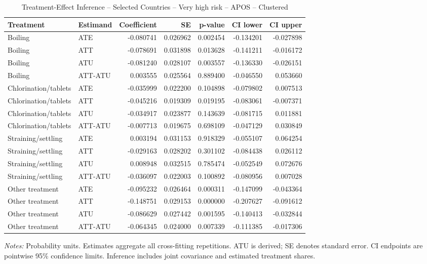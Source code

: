 \begin{table}[htbp]
\centering
\caption{Treatment-Effect Inference -- Selected Countries -- Very high risk -- APOS -- Clustered}
\label{tab:inference-VeryHighRiskHome-APOS-selected-countries}
\scriptsize
\begin{adjustbox}{max width=\linewidth}
\begin{tabular}{llrrrrr}
\toprule
Treatment & Estimand & Coefficient & SE & p-value & CI lower & CI upper \\
\midrule
Boiling & ATE & -0.080741 & 0.026962 & 0.002454 & -0.134201 & -0.027898 \\
Boiling & ATT & -0.078691 & 0.031898 & 0.013628 & -0.141211 & -0.016172 \\
Boiling & ATU & -0.081240 & 0.028107 & 0.003557 & -0.136330 & -0.026151 \\
Boiling & ATT-ATU & 0.003555 & 0.025564 & 0.889400 & -0.046550 & 0.053660 \\
Chlorination/tablets & ATE & -0.035999 & 0.022200 & 0.104898 & -0.079802 & 0.007513 \\
Chlorination/tablets & ATT & -0.045216 & 0.019309 & 0.019195 & -0.083061 & -0.007371 \\
Chlorination/tablets & ATU & -0.034917 & 0.023877 & 0.143639 & -0.081715 & 0.011881 \\
Chlorination/tablets & ATT-ATU & -0.007713 & 0.019675 & 0.698109 & -0.047129 & 0.030849 \\
Straining/settling & ATE & 0.003194 & 0.031153 & 0.918329 & -0.055107 & 0.064254 \\
Straining/settling & ATT & -0.029163 & 0.028202 & 0.301102 & -0.084438 & 0.026112 \\
Straining/settling & ATU & 0.008948 & 0.032515 & 0.785474 & -0.052549 & 0.072676 \\
Straining/settling & ATT-ATU & -0.036097 & 0.022003 & 0.100892 & -0.080956 & 0.007028 \\
Other treatment & ATE & -0.095232 & 0.026464 & 0.000311 & -0.147099 & -0.043364 \\
Other treatment & ATT & -0.148751 & 0.029153 & 0.000000 & -0.207627 & -0.091612 \\
Other treatment & ATU & -0.086629 & 0.027442 & 0.001595 & -0.140413 & -0.032844 \\
Other treatment & ATT-ATU & -0.064345 & 0.024000 & 0.007339 & -0.111385 & -0.017306 \\
\bottomrule
\end{tabular}

\end{adjustbox}
\par\smallskip
\begin{minipage}{\linewidth}\scriptsize \textit{Notes:} Probability units. Estimates aggregate all cross-fitting repetitions. ATU is derived; SE denotes standard error. CI endpoints are pointwise 95\% confidence limits. Inference includes joint covariance and estimated treatment shares. \end{minipage}
\end{table}

